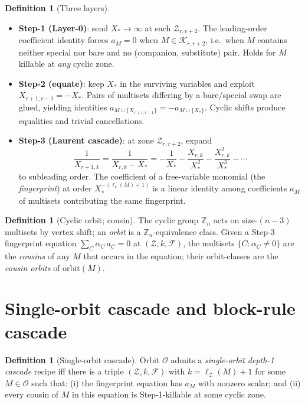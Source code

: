 \documentclass[11pt]{article}
\theoremstyle{definition}
\newtheorem{defn}[thm]{Definition}
\begin{document}
\begin{defn}[Three layers]\label{def:layers}\leavevmode\\[-1.2em]
\begin{itemize}[leftmargin=*]
\item \textbf{Step-1 (Layer-0)}: send $X_*\to\infty$ at each
$\mathcal Z_{r,r+2}$. The leading-order coefficient identity forces
$a_M=0$ when $M\in\mathcal K_{r,r+2}$, i.e.\ when $M$ contains
neither special nor bare and no (companion, substitute) pair. Holds
for $M$ killable at \emph{any} cyclic zone.

\item \textbf{Step-2 (equate)}: keep $X_*$ in the surviving variables
and exploit $X_{r+1,r-1}=-X_*$. Pairs of multisets differing by a
bare/special swap are glued, yielding identities
$a_{M\cup\{X_{r+1,r-1}\}}=-a_{M\cup\{X_*\}}$. Cyclic shifts produce
equalities and trivial cancellations.

\item \textbf{Step-3 (Laurent cascade)}: at zone $\mathcal Z_{r,r+2}$,
expand
\[
\frac{1}{X_{r+1,k}}=\frac{1}{X_{r,k}-X_*}
=-\frac{1}{X_*}-\frac{X_{r,k}}{X_*^2}-\frac{X_{r,k}^2}{X_*^3}-\cdots
\]
to subleading order. The coefficient of a free-variable monomial
(the \emph{fingerprint}) at order $X_*^{-(\ell_r(M)+1)}$ is a linear
identity among coefficients $a_M$ of multisets contributing the same
fingerprint.
\end{itemize}
\end{defn}

\begin{defn}[Cyclic orbit; cousin]\label{def:orbit}
The cyclic group $\mathbb Z_n$ acts on size-$(n-3)$ multisets by
vertex shift; an \emph{orbit} is a $\mathbb Z_n$-equivalence class.
Given a Step-3 fingerprint equation
$\sum_C\alpha_C\,a_C=0$ at $(\mathcal Z, k, \mathcal F)$, the
multisets $\{C : \alpha_C \ne 0\}$ are the \emph{cousins} of any
$M$ that occurs in the equation; their orbit-classes are the
\emph{cousin orbits} of $\mathrm{orbit}(M)$.
\end{defn}

\section{Single-orbit cascade and block-rule cascade}\label{sec:cascades}

\begin{defn}[Single-orbit cascade]
Orbit $\mathcal O$ admits a \emph{single-orbit depth-1 cascade}
recipe iff there is a triple $(\mathcal Z, k, \mathcal F)$ with
$k=\ell_{\mathcal Z}(M)+1$ for some $M\in\mathcal O$ such that:
(i) the fingerprint equation has $a_M$ with nonzero scalar; and
(ii) every cousin of $M$ in this equation is Step-1-killable at
some cyclic zone.
\end{defn}
\end{document}
